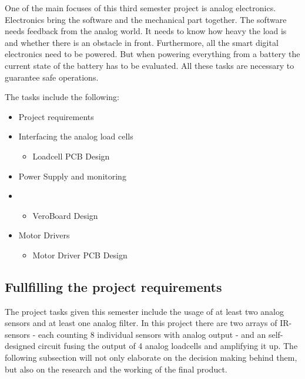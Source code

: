 \documentclass[../report.tex]{subfiles}
\begin{document}
One of the main focuses of this third semester project is analog electronics. Electronics bring the software and the mechanical part together. 
The software needs feedback from the analog world. It needs to know how heavy the load is and
whether there is an obstacle in front. Furthermore, all the smart digital electronics need to be powered. 
But when powering everything from a battery the current state of the battery has to be evaluated.
All these tasks are necessary to guarantee safe operations.

\quad
The tasks include the following:

\begin{itemize}
    \item Project requirements 
    \item Interfacing the analog load cells
    \begin{itemize}
      \item Loadcell PCB Design
    \end{itemize} 
    \item Power Supply and monitoring
    \item \begin{itemize}
      \item VeroBoard Design
    \end{itemize}
    \item Motor Drivers
    \begin{itemize}
      \item Motor Driver PCB Design
    \end{itemize}  
\end{itemize}

\subsection{Fullfilling the project requirements}
The project tasks given this semester include the usage of at least two analog sensors
and at least one analog filter. In this project there are two arrays of
IR-sensors - each counting 8 individual sensors with analog output - and 
an self-designed circuit fusing the output of 4 analog loadcells and amplifying 
it up. The following subsection will not only elaborate on the decision making
behind them, but also on the research and the working of the final product. 
  
\end{document}
